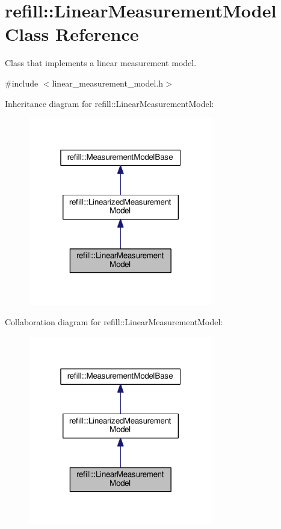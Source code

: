 \hypertarget{classrefill_1_1LinearMeasurementModel}{}\section{refill\+:\+:Linear\+Measurement\+Model Class Reference}
\label{classrefill_1_1LinearMeasurementModel}


Class that implements a linear measurement model.  




{\ttfamily \#include $<$linear\+\_\+measurement\+\_\+model.\+h$>$}



Inheritance diagram for refill\+:\+:Linear\+Measurement\+Model\+:\nopagebreak
\begin{figure}[H]
\begin{center}
\leavevmode
\includegraphics[width=229pt]{classrefill_1_1LinearMeasurementModel__inherit__graph}
\end{center}
\end{figure}


Collaboration diagram for refill\+:\+:Linear\+Measurement\+Model\+:\nopagebreak
\begin{figure}[H]
\begin{center}
\leavevmode
\includegraphics[width=229pt]{classrefill_1_1LinearMeasurementModel__coll__graph}
\end{center}
\end{figure}
